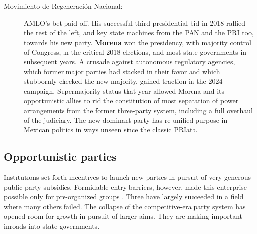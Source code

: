 \documentclass[letter,12pt]{article}
\begin{document}
\begin{description}
\item[Movimiento de Regeneración Nacional:] AMLO's bet paid off. His successful third presidential bid in 2018 rallied the rest of the left, and key state machines from the PAN and the PRI too, towards his new party. \textbf{Morena} won the presidency, with majority control of Congress,  in the critical 2018 elections, and most state governments in subsequent years. A crusade against autonomous regulatory agencies, which former major parties had stacked in their favor and which stubbornly checked the new majority, gained traction in the 2024 campaign. Supermajority status that year allowed Morena and its opportunistic allies to rid the constitution of most separation of power arrangements from the former three-party system, including a full overhaul of the judiciary. The new dominant party has re-unified purpose in Mexican politics in ways unseen since the classic PRIato.
  
\end{description}

\subsection{Opportunistic parties}

Institutions set forth incentives to launch new parties in pursuit of very generous public party subsidies. Formidable entry barriers, however, made this enterprise possible only for pre-organized groups \citep{magar.2007ref.2015}. Three have largely succeeded in a field where many others failed. The collapse of the competitive-era party system has opened room for growth in pursuit of larger aims. They are making important inroads into state governments.
\end{document}

